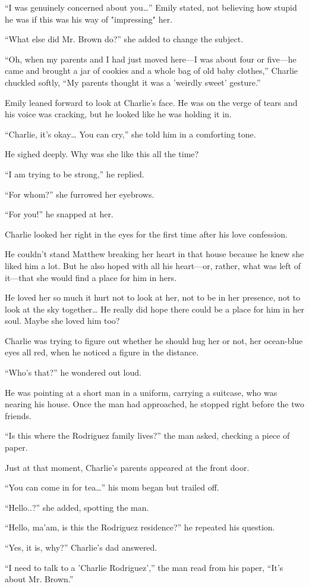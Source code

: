 “I was genuinely concerned about you…” Emily stated, not believing how stupid he was if this was his way of "impressing" her.

“What else did Mr. Brown do?” she added to change the subject.

“Oh, when my parents and I had just moved here—I was about four or five—he came and brought a jar of cookies and a whole bag of old baby clothes,” Charlie chuckled softly, “My parents thought it was a 'weirdly sweet' gesture.”

Emily leaned forward to look at Charlie's face. He was on the verge of tears and his voice was cracking, but he looked like he was holding it in.

“Charlie, it's okay… You can cry,” she told him in a comforting tone.

He sighed deeply. Why was she like this all the time?

“I am trying to be strong,” he replied.

“For whom?” she furrowed her eyebrows.

“For you!” he snapped at her.

Charlie looked her right in the eyes for the first time after his love confession.

He couldn't stand Matthew breaking her heart in that house because he knew she liked him a lot. But he also hoped with all his heart—or, rather, what was left of it—that she would find a place for him in hers.

He loved her so much it hurt not to look at her, not to be in her presence, not to look at the sky together… He really did hope there could be a place for him in her soul. Maybe she loved him too?

Charlie was trying to figure out whether he should hug her or not, her ocean-blue eyes all red, when he noticed a figure in the distance.

“Who's that?” he wondered out loud.

He was pointing at a short man in a uniform, carrying a suitcase, who was nearing his house. Once the man had approached, he stopped right before the two friends.

“Is this where the Rodriguez family lives?” the man asked, checking a piece of paper.

Just at that moment, Charlie's parents appeared at the front door.

“You can come in for tea…” his mom began but trailed off.

“Hello..?” she added, spotting the man.

“Hello, ma'am, is this the Rodriguez residence?” he repeated his question.

“Yes, it is, why?” Charlie's dad answered.

“I need to talk to a 'Charlie Rodriguez',” the man read from his paper, “It's about Mr. Brown.”